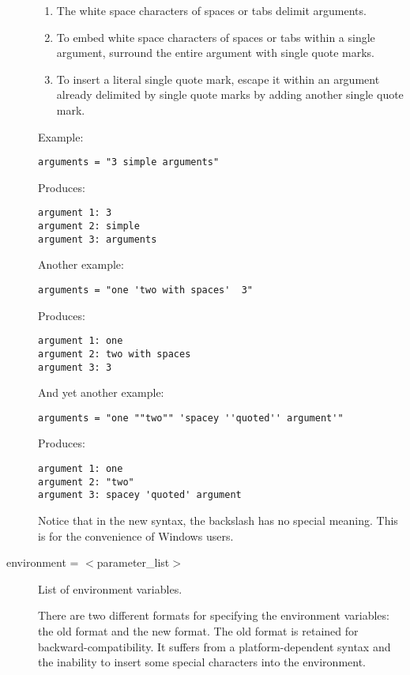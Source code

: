 \begin{description}
\begin{enumerate}
\item The white space characters of spaces or tabs delimit arguments.

\item To embed white space characters of spaces or tabs within a 
single argument,
surround the entire argument with single quote marks.

\item To insert a literal single quote mark, escape it within
an argument already delimited by single quote marks
by adding another single quote mark.

\end{enumerate}

Example:
\begin{verbatim}
arguments = "3 simple arguments"
\end{verbatim}
Produces:
\begin{verbatim}
argument 1: 3
argument 2: simple
argument 3: arguments
\end{verbatim}

Another example:
\begin{verbatim}
arguments = "one 'two with spaces'	3"
\end{verbatim}
Produces:
\begin{verbatim}
argument 1: one
argument 2: two with spaces
argument 3: 3
\end{verbatim}

And yet another example:
\begin{verbatim}
arguments = "one ""two"" 'spacey ''quoted'' argument'"
\end{verbatim}

Produces:
\begin{verbatim}
argument 1: one
argument 2: "two"
argument 3: spacey 'quoted' argument
\end{verbatim}

Notice that in the new syntax, the backslash has no special meaning.
This is for the convenience of Windows users.


\label{man-condor-submit-environment}
\item[environment = $<$parameter\_list$>$] 
List of environment
variables.

There are two different formats for specifying the environment
variables: the old format and the new format.  The old format is
retained for backward-compatibility.  It suffers from a
platform-dependent syntax and the inability to insert some special
characters into the environment.


\end{description}
